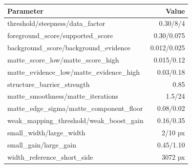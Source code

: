 \begin{tabular}{lr}
\toprule
Parameter & Value \\
\midrule
threshold/steepness/data\_factor & 0.30/8/4 \\
foreground\_score/supported\_score & 0.30/0.075 \\
background\_score/background\_evidence & 0.012/0.025 \\
matte\_score\_low/matte\_score\_high & 0.015/0.12 \\
matte\_evidence\_low/matte\_evidence\_high & 0.03/0.18 \\
structure\_barrier\_strength & 0.85 \\
matte\_smoothness/matte\_iterations & 1.5/24 \\
matte\_edge\_sigma/matte\_component\_floor & 0.08/0.02 \\
weak\_mapping\_threshold/weak\_boost\_gain & 0.16/0.35 \\
small\_width/large\_width & 2/10 px \\
small\_gain/large\_gain & 0.45/1.10 \\
width\_reference\_short\_side & 3072 px \\
\bottomrule
\end{tabular}
